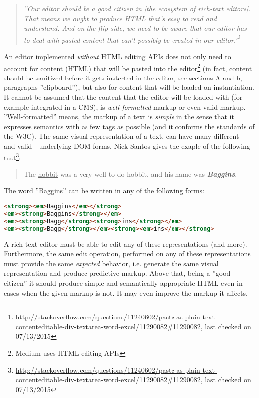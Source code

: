 \begin{quotation}
\textit{''Our editor should be a good citizen in [the ecosystem of rich-text editors]. That means we ought to produce HTML that's easy to read and understand. And on the flip side, we need to be aware that our editor has to deal with pasted content that can't possibly be created in our editor.''}\footnote{\url{http://stackoverflow.com/questions/11240602/paste-as-plain-text-contenteditable-div-textarea-word-excel/11290082#11290082}, last checked on 07/13/2015}
\end{quotation}

An editor implemented \textit{without} HTML editing APIs does not only need to account for content (HTML) that will be pasted into the editor\footnote{Medium uses HTML editing APIs} (in fact, content should be sanitized before it gets insterted in the editor, see sections A and b, paragraphs ''clipboard''), but also for content that will be loaded on instantiation. It cannot be assumed that the content that the editor will be loaded with (for example integrated in a CMS), is \textit{well-formatted} markup or even valid markup. ''Well-formatted'' means, the markup of a text is \textit{simple} in the sense that it expresses semantics with as few tags as possible (and it conforms the standards  of the W3C). The same visual representation of a text, can have many different---and valid---underlying DOM forms. Nick Santos gives the exaple of the following text\footnote{\url{http://stackoverflow.com/questions/11240602/paste-as-plain-text-contenteditable-div-textarea-word-excel/11290082#11290082}, last checked on 07/13/2015}:

\begin{quotation}
The \underline{hobbit} was a very well-to-do hobbit, and his name was \textbf{\textit{Baggins}}.
\end{quotation}

\noindent The word ''Baggins'' can be written in any of the following forms:

\begin{lstlisting}[language=html, caption=Different DOM representations of an equally formatted text, label=lst:different-dom-representations]
<strong><em>Baggins</em></strong>
<em><strong>Baggins</strong></em>
<em><strong>Bagg</strong><strong>ins</strong></em>
<em><strong>Bagg</strong></em><strong><em>ins</em></strong>
\end{lstlisting}

A rich-text editor must be able to edit any of these representations (and more). Furthermore, the same edit operation, performed on any of these representations must provide the same \textit{expected} behavior, i.e. generate the same visual representation and produce predictive markup. Above that, being a ''good citizen'' it should produce simple and semantically appropriate HTML even in cases when the given markup is not. It may even improve the markup it affects.


